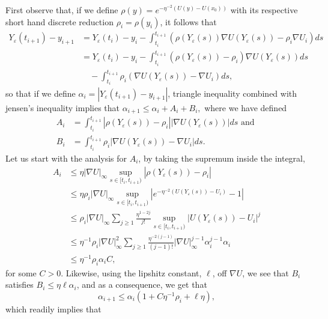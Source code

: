 \documentclass{amsproc}
\newcommand{\eps}{\varepsilon}
\newcommand{\y}{Y_\eps}
\begin{document}
First observe that, if we define $\rho(y) = e^{ - \eta^{-2} \left(  U(y) - U(x_0) \right )}$ with its respective short hand discrete reduction $\rho_i = \rho(y_i)$, it follows that 
\begin{align*}
\y(t_{i+1}) - y_{i+1} &= \y(t_i) - y_i  - \int_{t_i}^{t_{i+1}} \left(  \rho(\y(s) ) \nabla U(\y(s)) - \rho_i \nabla U_i \right ) ds \\
& = \y(t_i) - y_i  - \int_{t_i}^{t_{i+1}} \left(  \rho(\y(s) ) - \rho_i \right) \nabla U(\y(s)) ds 
\\ & \quad - \int_{t_i}^{t_{i+1}} \rho_i\left(\nabla U(\y(s)) -  \nabla U_i \right ) ds,
\end{align*}
so that if we define $\alpha_i = \left\vert  \y(t_{i+1}) - y_{i+1} \right\vert$, triangle inequality combined with jensen's inequality implies that 
$\alpha_{i+1} \leq \alpha_i + A_i + B_i,$ where we have defined 
\begin{align*}
A_i &=   \int_{t_i}^{t_{i+1}} \left\vert  \rho(\y(s) ) - \rho_i \right\vert \left \vert \nabla U(\y(s)) \right \vert ds \text{ and }\\
B_i &= \int_{t_i}^{t_{i+1}} \rho_i\left\vert\nabla U(\y(s)) -  \nabla U_i \right\vert ds.
\end{align*}
Let us start with the analysis for $A_i$, by taking the supremum inside the integral, 
\begin{align*}
A_i  &\leq \eta \left \vert \nabla U \right \vert_\infty \sup_{ s\in [t_i, t_{i+1}) } \left\vert  \rho(\y(s) ) - \rho_i \right\vert \\
&\leq \eta \rho_i \left \vert \nabla U \right \vert_\infty \sup_{ s\in [t_i, t_{i+1}) } \left\vert  e^{ - \eta^{-2} \left(  U(\y(s)) - U_i \right )} - 1\right\vert \\
&\leq \rho_i \left \vert \nabla U \right \vert_\infty \sum_{j \geq 1 } \frac{ \eta^{1 - 2j } }{j!}  \sup_{ s\in [t_i, t_{i+1}) } \left \vert  U(\y(s)) - U_i \right \vert^j   \\
&\leq \eta^{-1} \rho_i \left \vert \nabla U \right \vert_\infty^2 \sum_{j \geq 1 } \frac{ \eta^{- 2(j-1) } }{(j-1)!} \left \vert \nabla U \right \vert_\infty^{j-1} \alpha_i^{j-1} \alpha_i \\
&\leq \eta^{-1} \rho_i \alpha_i C,
\end{align*}
for some $C>0$. Likewise, using the lipshitz constant, $\ell$, off $\nabla U$, we see that $B_i$ satisfies $B_i \leq \eta \ell \alpha_i$, and as a consequence,  we get that 
\[
\alpha_{i+1} \leq \alpha_i \left( 1 + C \eta^{-1} \rho_i + \ell \eta \right),
\]
which readily implies that 
\end{document}
